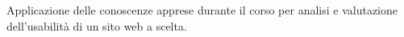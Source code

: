 Applicazione delle conoscenze apprese durante il corso
per analisi e valutazione dell'usabilità di un sito web
a scelta.
